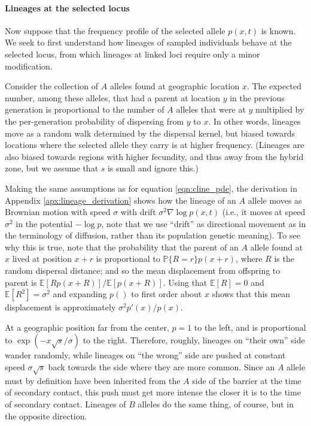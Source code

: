 \documentclass[11pt,letterpaper]{article}
\newcommand{\alisa}[1]{{\em \color{red} #1}}
\newcommand{\E}{\mathbb{E}}
\renewcommand{\P}{\mathbb{P}}
\newcommand{\grad}{\nabla}
\begin{document}
\paragraph{Lineages at the selected locus}
Now suppose that the frequency profile of the selected allele $p(x,t)$ is known.
We seek to first understand how lineages of sampled individuals behave at the selected locus,
from which lineages at linked loci require only a minor modification.

Consider the collection of $A$ alleles found at geographic location $x$.
The expected number, among these alleles, that had a parent at location $y$ in the previous generation 
is proportional to the number of $A$ alleles that were at $y$ multiplied by the per-generation probability of dispersing from $y$ to $x$. 
In other words, lineages move as a random walk determined by the dispersal kernel,
but biased towards locations where the selected allele they carry is at higher frequency.
(Lineages are also biased towards regions with higher fecundity,
and thus away from the hybrid zone, but we assume that $s$ is small and ignore this.)

Making the same assumptions as for equation \eqref{eqn:cline_pde}, the derivation in Appendix \ref{apx:lineage_derivation} shows 
how the lineage of an $A$ allele moves as Brownian motion with speed $\sigma$
with drift $\sigma^2 \grad \log p(x,t)$ (i.e., it moves at speed $\sigma^2$ in the potential $-\log p$, note that we use ``drift'' as directional movement as in the terminology of diffusion, rather than its population genetic meaning).  %
To see why this is true, note that the probability that the parent of an $A$ allele found at $x$
lived at position $x+r$ is proportional to $\P\{R=r\} p(x+r)$, where $R$ is the random dispersal distance;
and so the mean displacement from offspring to parent is $\E[R p(x+R)]/\E[p(x+R)]$.
Using that $\E[R]=0$ and $\E[R^2]=\sigma^2$
and expanding $p()$ to first order about $x$ shows that this mean displacement is approximately $\sigma^2 p'(x)/p(x)$.

At a geographic position far from the center, $p=1$ to the left, and is proportional to  $\exp(-x\sqrt{s}/\sigma)$ to the right.
Therefore, roughly, lineages on ``their own'' side wander randomly,
while lineages on ``the wrong'' side are pushed at constant speed $\sigma\sqrt{s}$ 
back towards the side where they are more common. 
Since an $A$ allele must by definition have been inherited from the $A$ side of the barrier 
at the time of secondary contact, this push must get more intense the closer it is to the time of secondary contact.
Lineages of $B$ alleles do the same thing, of course, but in the opposite direction. 
\end{document}
